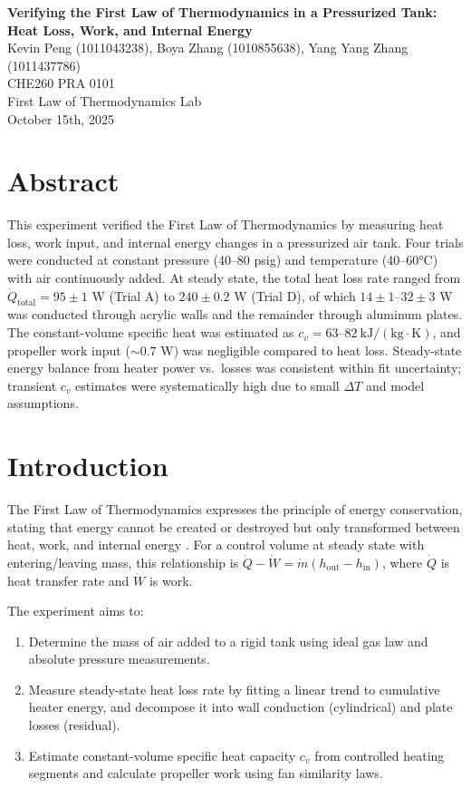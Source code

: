 \documentclass[12pt]{article}
\begin{document}
\begin{center}
\textbf{\Large Verifying the First Law of Thermodynamics in a Pressurized Tank: Heat Loss, Work, and Internal Energy} \\[0.5em]
Kevin Peng (1011043238), Boya Zhang (1010855638), Yang Yang Zhang (1011437786)\\[0.5em]
CHE260 PRA 0101 \\
First Law of Thermodynamics Lab \\
October 15th, 2025 \\
\end{center}

\section*{Abstract}
This experiment verified the First Law of Thermodynamics by measuring heat loss, work input, and internal energy changes in a pressurized air tank. Four trials were conducted at constant pressure (40--80 psig) and temperature (40--60°C) with air continuously added. At steady state, the total heat loss rate ranged from $\dot{Q}_{\text{total}} = 95 \pm 1$ W (Trial A) to $240 \pm 0.2$ W (Trial D), of which $14 \pm 1$--$32 \pm 3$ W was conducted through acrylic walls and the remainder through aluminum plates. The constant-volume specific heat was estimated as $c_v = 63$--$82~\mathrm{kJ/(kg \cdot K)}$, and propeller work input ($\sim 0.7$ W) was negligible compared to heat loss. Steady-state energy balance from heater power vs.\ losses was consistent within fit uncertainty; transient $c_v$ estimates were systematically high due to small $\Delta T$ and model assumptions.

\section*{Introduction}
The First Law of Thermodynamics expresses the principle of energy conservation, stating that energy cannot be created or destroyed but only transformed between heat, work, and internal energy \cite{che260_manual}. For a control volume at steady state with entering/leaving mass, this relationship is $\dot{Q} - \dot{W} = \dot{m}(h_{\text{out}} - h_{\text{in}})$, where $\dot{Q}$ is heat transfer rate and $\dot{W}$ is work.

The experiment aims to:
\begin{enumerate}
    \item Determine the mass of air added to a rigid tank using ideal gas law and absolute pressure measurements.
    \item Measure steady-state heat loss rate by fitting a linear trend to cumulative heater energy, and decompose it into wall conduction (cylindrical) and plate losses (residual).
    \item Estimate constant-volume specific heat capacity $c_v$ from controlled heating segments and calculate propeller work using fan similarity laws.
\end{enumerate}
\end{document}
